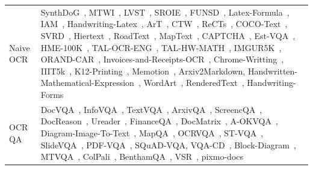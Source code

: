 \documentclass{llmxive}
\begin{document}
\begin{table}[!tbp]
{\begin{tabular}{m{1.6cm}|>{\small}m{15.4cm}}
Naive OCR & SynthDoG~\cite{kim2022synthdog}, MTWI~\cite{he2018icpr2018_MTWI}, LVST~\cite{sun2019lsvt}, SROIE~\cite{huang2019icdar_sroie}, FUNSD~\cite{jaume2019funsd}, Latex-Formula~\cite{oleehyo_latex_formulas}, IAM~\cite{marti2002iam}, Handwriting-Latex~\cite{aida}, ArT~\cite{chng2019art}, CTW~\cite{yuan2019ctw}, ReCTs~\cite{zhang2019rects}, COCO-Text~\cite{veit2016cocotext}, SVRD~\cite{yu2023icdar_svrd}, Hiertext~\cite{long2023icdar_hiertext}, RoadText~\cite{tom2023icdar_roadtext}, MapText~\cite{li2024icdar_maptext}, CAPTCHA~\cite{captcha}, Est-VQA~\cite{wang2020estvqa}, HME-100K~\cite{tal}, TAL-OCR-ENG~\cite{tal}, TAL-HW-MATH~\cite{tal}, IMGUR5K~\cite{krishnan2023textstylebrush_Imgur5K}, ORAND-CAR~\cite{diem2014icfhr_RAND_CAR}, Invoices-and-Receipts-OCR~\cite{mychen76_invoices_receipts_ocr_v1},  Chrome-Writting~\cite{mouchere2016icfhr2016_chrome_writing}, IIIT5k~\cite{mishra2012scene_iiit5k}, K12-Printing~\cite{tal}, Memotion~\cite{ramamoorthy2022memotion}, Arxiv2Markdown, Handwritten-Mathematical-Expression~\cite{Azu}, WordArt~\cite{xie2022toward_wordart}, 
RenderedText~\cite{wendlerc_renderedtext}, Handwriting-Forms~\cite{ift_handwriting_forms}\\

\footnotesize 
OCR QA &  DocVQA~\cite{clark2017docqa}, InfoVQA~\cite{mathew2022infographicvqa}, TextVQA~\cite{singh2019textvqa}, ArxivQA~\cite{li2024multimodal_arxivQA},
ScreencQA~\cite{hsiao2022screenqa}, DocReason~\cite{mplug_docreason25k}, Ureader~\cite{ye2023ureader}, FinanceQA~\cite{Sujet-Finance-QA-Vision-100k}, DocMatrix~\cite{laurenccon2024building_docmatrix}, A-OKVQA~\cite{schwenk2022aokvqa}, Diagram-Image-To-Text~\cite{kamizuru00_diagram_image_to_text}, MapQA~\cite{chang2022mapqa}, OCRVQA~\cite{mishra2019ocrvqa}, ST-VQA~\cite{biten2019stvqa}, SlideVQA~\cite{tanaka2023slidevqa}, PDF-VQA~\cite{ding2023PDFvqa}, SQuAD-VQA, VQA-CD~\cite{mahamoud2024chic_vqa_cd}, Block-Diagram~\cite{shreyanshu09_block_diagram}, MTVQA~\cite{tang2024mtvqa}, ColPali~\cite{faysse2024colpali}, BenthamQA~\cite{mathew2021asking_benthamqa}, VSR~\cite{zhang2021vsr}, pixmo-docs~\cite{deitke2025molmo}\\


\end{tabular}}
\end{table}
\end{document}
